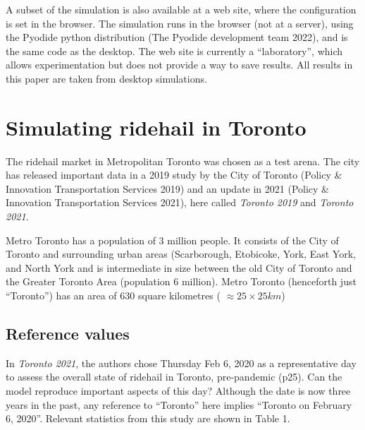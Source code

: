 \documentclass[
  letterpaper,
]{article}
\begin{document}
A subset of the simulation is also available at a web site, where the
configuration is set in the browser. The simulation runs in the browser
(not at a server), using the Pyodide python distribution (The Pyodide
development team 2022), and is the same code as the desktop. The web
site is currently a ``laboratory'', which allows experimentation but
does not provide a way to save results. All results in this paper are
taken from desktop simulations.

\hypertarget{simulating-ridehail-in-toronto}{%
\section{Simulating ridehail in
Toronto}\label{simulating-ridehail-in-toronto}}

The ridehail market in Metropolitan Toronto was chosen as a test arena.
The city has released important data in a 2019 study by the City of
Toronto (Policy \& Innovation Transportation Services 2019) and an
update in 2021 (Policy \& Innovation Transportation Services 2021), here
called \emph{Toronto 2019} and \emph{Toronto 2021}.

Metro Toronto has a population of 3 million people. It consists of the
City of Toronto and surrounding urban areas (Scarborough, Etobicoke,
York, East York, and North York and is intermediate in size between the
old City of Toronto and the Greater Toronto Area (population 6 million).
Metro Toronto (henceforth just ``Toronto'') has an area of 630 square
kilometres ( \(\approx 25 \times 25 km\))

\hypertarget{reference-values}{%
\subsection{Reference values}\label{reference-values}}

In \emph{Toronto 2021}, the authors chose Thursday Feb 6, 2020 as a
representative day to assess the overall state of ridehail in Toronto,
pre-pandemic (p25). Can the model reproduce important aspects of this
day? Although the date is now three years in the past, any reference to
``Toronto'' here implies ``Toronto on February 6, 2020''. Relevant
statistics from this study are shown in Table 1.
\end{document}
